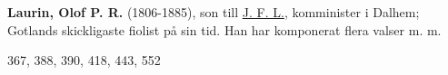 \textbf{Laurin, Olof P. R.} (1806-1885), son till \href{Laurin-J-F}{J. F. L.}, komminister i Dalhem; Gotlands skickligaste fiolist på sin tid.
Han har komponerat flera valser m. m. 

367, 388, 390, 418, 443, 552 
